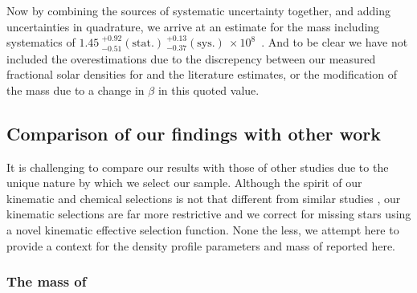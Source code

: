 Now by combining the sources of systematic uncertainty together, and adding uncertainties in quadrature, we arrive at an estimate for the mass including systematics of $1.45\ ^{+0.92}_{-0.51} \mathrm{(stat.)}\ ^{+0.13}_{-0.37} \mathrm{(sys.)}\ \times10^{8}$~\Msun. And to be clear we have not included the overestimations due to the discrepency between our measured fractional solar densities for \gse and the literature estimates, or the modification of the mass due to a change in $\beta$ in this quoted value.

\subsection{Comparison of our findings with other work}
\label{subsec:comparison-with-other-work}

It is challenging to compare our results with those of other studies due to the unique nature by which we select our sample. Although the spirit of our kinematic and chemical selections is not that different from similar studies \parencite[e.g.][]{mackereth20,han22}, our kinematic selections are far more restrictive and we correct for missing stars using a novel kinematic effective selection function. None the less, we attempt here to provide a context for the density profile parameters and mass of \gse reported here.

\subsubsection{The mass of \gse}

